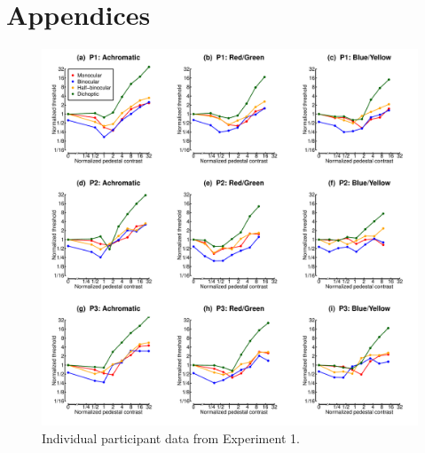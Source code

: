 \documentclass[
  letterpaper,
  DIV=11,
  numbers=noendperiod]{scrartcl}
\begin{document}
\hypertarget{appendices}{%
\section{Appendices}\label{appendices}}

\beginsupplement

\begin{figure}

{\centering \includegraphics{Figures/individualdippers.pdf}

}

\caption{\label{fig-individualdippers}Individual participant data from
Experiment 1.}

\end{figure}
\end{document}
